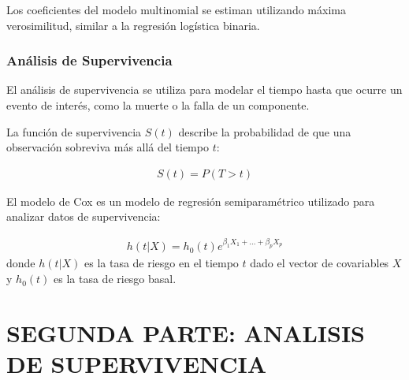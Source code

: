 \documentclass[a4paper]{report} %
\begin{document}

Los coeficientes del modelo multinomial se estiman utilizando m\'axima verosimilitud, similar a la regresi\'on log\'istica binaria.

\section{An\'alisis de Supervivencia}

El an\'alisis de supervivencia se utiliza para modelar el tiempo hasta que ocurre un evento de inter\'es, como la muerte o la falla de un componente.


La funci\'on de supervivencia $S(t)$ describe la probabilidad de que una observaci\'on sobreviva m\'as all\'a del tiempo $t$:

\begin{eqnarray*}
S(t) = P(T > t)
\end{eqnarray*}


El modelo de Cox es un modelo de regresi\'on semiparam\'etrico utilizado para analizar datos de supervivencia:

\begin{eqnarray*}
h(t|X) = h_0(t) e^{\beta_1 X_1 + \ldots + \beta_p X_p}
\end{eqnarray*}
donde $h(t|X)$ es la tasa de riesgo en el tiempo $t$ dado el vector de covariables $X$ y $h_0(t)$ es la tasa de riesgo basal.




\part{SEGUNDA PARTE: ANALISIS DE SUPERVIVENCIA}


\end{document}
